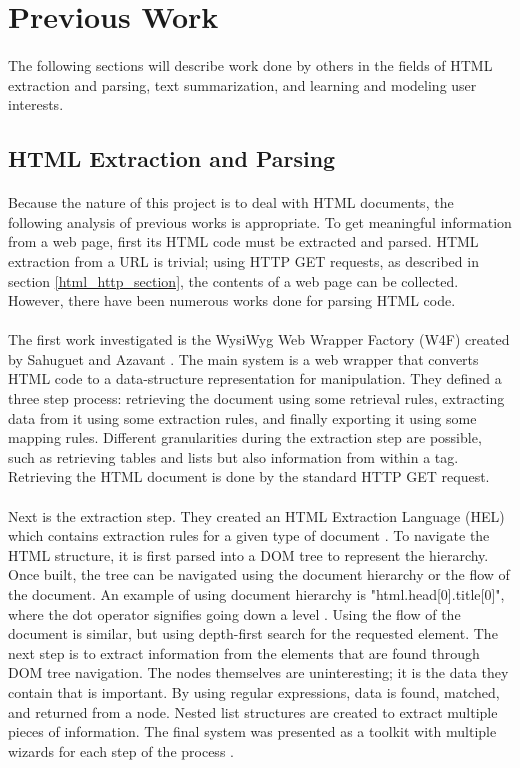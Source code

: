 \documentclass[11pt,titlepage]{report}
\begin{document}
\section{Previous Work}
\paragraph{}
The following sections will describe work done by others in the fields of HTML extraction and parsing, text summarization, and learning and modeling user interests. 
\subsection{HTML Extraction and Parsing}
\paragraph{}
Because the nature of this project is to deal with HTML documents, the following analysis of previous works is appropriate. To get meaningful information from a web page, first its HTML code must be extracted and parsed. HTML extraction from a URL is trivial; using HTTP GET requests, as described in section \ref{html_http_section}, the contents of a web page can be collected. However, there have been numerous works done for parsing HTML code. 
\paragraph{}
The first work investigated is the WysiWyg Web Wrapper Factory (W4F) created by Sahuguet and Azavant \cite{w4f}. The main system is a web wrapper that converts HTML code to a data-structure representation for manipulation. They defined a three step process: retrieving the document using some retrieval rules, extracting data from it using some extraction rules, and finally exporting it using some mapping rules. Different granularities during the extraction step are possible, such as retrieving tables and lists but also information from within a tag. Retrieving the HTML document is done by the standard HTTP GET request. 
\paragraph{}
Next is the extraction step. They created an HTML Extraction Language (HEL) which contains extraction rules for a given type of document \cite{w4f}. To navigate the HTML structure, it is first parsed into a DOM tree to represent the hierarchy. Once built, the tree can be navigated using the document hierarchy or the flow of the document. An example of using document hierarchy is "html.head[0].title[0]", where the dot operator signifies going down a level \cite{w4f}. Using the flow of the document is similar, but using depth-first search for the requested element. The next step is to extract information from the elements that are found through DOM tree navigation. The nodes themselves are uninteresting; it is the data they contain that is important. By using regular expressions, data is found, matched, and returned from a node. Nested list structures are created to extract multiple pieces of information. The final system was presented as a toolkit with multiple wizards for each step of the process \cite{w4f}.
\end{document}
